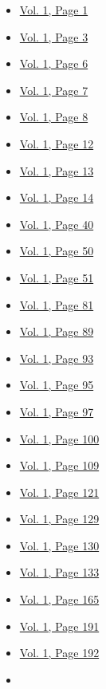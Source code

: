 \begin{itemize}
  \begin{itemize}
  \tightlist
  \item
    \protect\hyperlink{g-page-9}{Vol. 1, Page 1}
  \item
    \protect\hyperlink{g-page-11}{Vol. 1, Page 3}
  \item
    \protect\hyperlink{g-page-14}{Vol. 1, Page 6}
  \item
    \protect\hyperlink{g-page-15}{Vol. 1, Page 7}
  \item
    \protect\hyperlink{g-page-16}{Vol. 1, Page 8}
  \item
    \protect\hyperlink{g-page-20}{Vol. 1, Page 12}
  \item
    \protect\hyperlink{g-page-21}{Vol. 1, Page 13}
  \item
    \protect\hyperlink{g-page-22}{Vol. 1, Page 14}
  \item
    \protect\hyperlink{g-page-48}{Vol. 1, Page 40}
  \item
    \protect\hyperlink{g-page-58}{Vol. 1, Page 50}
  \item
    \protect\hyperlink{g-page-59}{Vol. 1, Page 51}
  \item
    \protect\hyperlink{g-page-89}{Vol. 1, Page 81}
  \item
    \protect\hyperlink{g-page-97}{Vol. 1, Page 89}
  \item
    \protect\hyperlink{g-page-101}{Vol. 1, Page 93}
  \item
    \protect\hyperlink{g-page-103}{Vol. 1, Page 95}
  \item
    \protect\hyperlink{g-page-105}{Vol. 1, Page 97}
  \item
    \protect\hyperlink{g-page-108}{Vol. 1, Page 100}
  \item
    \protect\hyperlink{g-page-117}{Vol. 1, Page 109}
  \item
    \protect\hyperlink{g-page-129}{Vol. 1, Page 121}
  \item
    \protect\hyperlink{g-page-137}{Vol. 1, Page 129}
  \item
    \protect\hyperlink{g-page-138}{Vol. 1, Page 130}
  \item
    \protect\hyperlink{g-page-141}{Vol. 1, Page 133}
  \item
    \protect\hyperlink{g-page-173}{Vol. 1, Page 165}
  \item
    \protect\hyperlink{g-page-199}{Vol. 1, Page 191}
  \item
    \protect\hyperlink{g-page-200}{Vol. 1, Page 192}
  \item

\end{itemize}
\end{itemize}
